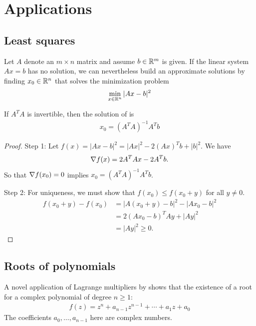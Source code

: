 \section{Applications}

\subsection{Least squares}

Let $A$ denote an $m \times n$ matrix and assume $b \in \mathbb{R}^m$ is given.
If the linear system $Ax = b$ has no solution, we can nevertheless build an approximate solutions by finding $x_0 \in \mathbb{R}^n$ that solves the minimization problem
\begin{align}
\min _{x \in \R^n} |Ax-b|^2 \labeq{least_squares}
\end{align}

\begin{theorem}
If $A^T A$ is invertible, then the solution of  is
\begin{align}
x_0 = (A^T A)^{-1} A^T b
\end{align}
\end{theorem}

\begin{proof}
Step 1:
Let $f(x) = |Ax-b|^2 = |Ax|^2 - 2 (Ax)^T b + |b|^2$.
We have
\begin{align}
\nabla f(x) = 2 A^T A x - 2 A^T b.
\end{align}
So that $\nabla f(x_0) = 0$ implies $x_0 = (A^T A)^{-1} A^T b$.

Step 2:
For uniqueness, we must show that $f(x_0) \le f(x_0 + y)$ for all $y \ne 0$.
\begin{align}
f(x_0+y)-f(x_0) &= |A(x_0+y) -b|^2 - |Ax_0-b|^2 \\
&= 2 (Ax_0-b)^TAy+|Ay|^2 \nonumber \\
&= |Ay|^2 \ge 0. \nonumber
\end{align}
\end{proof}

\subsection{Roots of polynomials}

A novel application of Lagrange multipliers by  shows that the existence of a root for a complex polynomial of degree $n \ge 1$:
\begin{align}
f(z) = z^n + a_{n-1} z^{n-1} + \cdots + a_1 z + a_0
\end{align}
The coefficients $a_0, \dots, a_{n-1}$ here are complex numbers.

